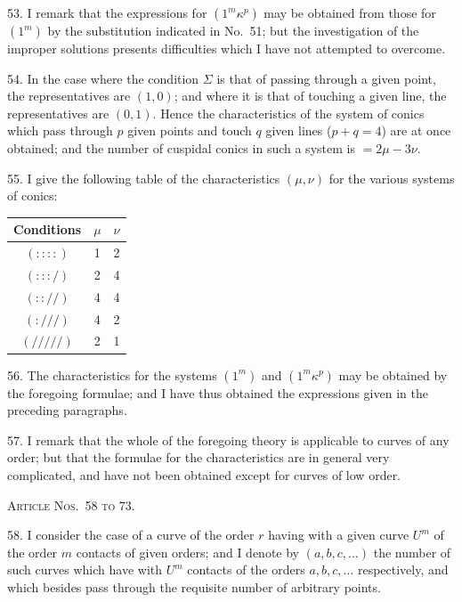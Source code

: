 \documentclass[12pt,a4paper]{article}
\begin{document}
53. I remark that the expressions for $(1^m \kappa^p)$ may be obtained from those for $(1^m)$ by the substitution indicated in No.~51; but the investigation of the improper solutions presents difficulties which I have not attempted to overcome.

54. In the case where the condition $\Sigma$ is that of passing through a given point, the representatives are $(1, 0)$; and where it is that of touching a given line, the representatives are $(0, 1)$. Hence the characteristics of the system of conics which pass through $p$ given points and touch $q$ given lines ($p + q = 4$) are at once obtained; and the number of cuspidal conics in such a system is $= 2\mu - 3\nu$.

55. I give the following table of the characteristics $(\mu, \nu)$ for the various systems of conics:
\begin{center}
\begin{tabular}{c|c|c}
\hline
Conditions & $\mu$ & $\nu$ \\
\hline
$(::::)$ & 1 & 2 \\
$(::: /)$ & 2 & 4 \\
$(:: //)$ & 4 & 4 \\
$(: ///)$ & 4 & 2 \\
$(/////)$ & 2 & 1 \\
\hline
\end{tabular}
\end{center}

56. The characteristics for the systems $(1^m)$ and $(1^m \kappa^p)$ may be obtained by the foregoing formulae; and I have thus obtained the expressions given in the preceding paragraphs.

57. I remark that the whole of the foregoing theory is applicable to curves of any order; but that the formulae for the characteristics are in general very complicated, and have not been obtained except for curves of low order.

\bigskip
\noindent\textsc{Article Nos.~58 to 73.}

\smallskip

58. I consider the case of a curve of the order $r$ having with a given curve $U^m$ of the order $m$ contacts of given orders; and I denote by $(a, b, c, \dots)$ the number of such curves which have with $U^m$ contacts of the orders $a, b, c, \dots$ respectively, and which besides pass through the requisite number of arbitrary points.
\end{document}
